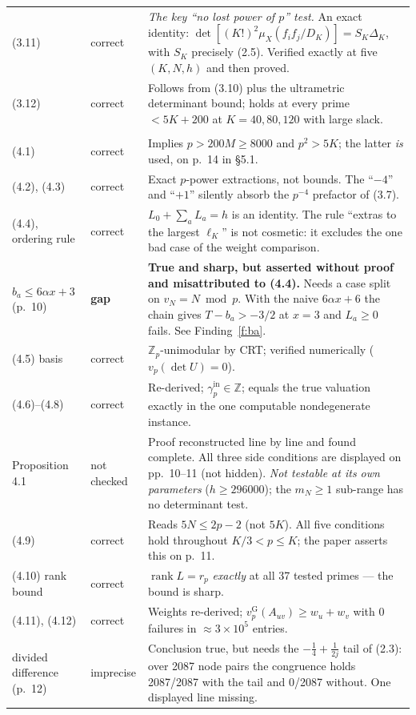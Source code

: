 \documentclass[11pt]{article}
\theoremstyle{definition}
\newcommand{\vG}{v_p^{\mathrm{G}}}
\newcommand{\gin}{\gamma_p^{\mathrm{in}}}
\newcommand{\OK}{correct}
\newcommand{\IM}{imprecise}
\newcommand{\GP}{\textbf{gap}}
\newcommand{\NC}{not checked}
\begin{document}
\begin{longtable}{@{}p{2.55cm}p{1.75cm}p{9.5cm}@{}}
(3.11) & \OK & \emph{The key ``no lost power of $p$'' test.} An exact identity: $\det[(K!)^2\mu_X(f_if_j/D_K)]=S_K\Delta_K$, with $S_K$ precisely (2.5). Verified exactly at five $(K,N,h)$ and then proved. \\
(3.12) & \OK & Follows from (3.10) plus the ultrametric determinant bound; holds at every prime $<5K+200$ at $K=40,80,120$ with large slack. \\
\addlinespace
\multicolumn{3}{@{}l}{\textbf{Section 4}}\\
(4.1) & \OK & Implies $p>200M\ge8000$ and $p^2>5K$; the latter \emph{is} used, on p.~14 in \S5.1. \\
(4.2), (4.3) & \OK & Exact $p$-power extractions, not bounds. The ``$-4$'' and ``$+1$'' silently absorb the $p^{-4}$ prefactor of (3.7). \\
(4.4), ordering rule & \OK & $L_0+\sum_aL_a=h$ is an identity. The rule ``extras to the largest $\ell_K$'' is not cosmetic: it excludes the one bad case of the weight comparison. \\
$b_a\le6\alpha x+3$ (p.~10) & \GP & \textbf{True and sharp, but asserted without proof and misattributed to (4.4).} Needs a case split on $v_N=N\bmod p$. With the naive $6\alpha x+6$ the chain gives $T-b_a>-3/2$ at $x=3$ and $L_a\ge0$ fails. See Finding~\ref{f:ba}. \\
(4.5) basis & \OK & $\mathbb{Z}_p$-unimodular by CRT; verified numerically ($v_p(\det U)=0$). \\
(4.6)--(4.8) & \OK & Re-derived; $\gin\in\mathbb{Z}$; equals the true valuation exactly in the one computable nondegenerate instance. \\
Proposition 4.1 & \NC & Proof reconstructed line by line and found complete. All three side conditions are displayed on pp.~10--11 (not hidden). \emph{Not testable at its own parameters} ($h\ge296000$); the $m_N\ge1$ sub-range has no determinant test. \\
(4.9) & \OK & Reads $5N\le2p-2$ (not $5K$). All five conditions hold throughout $K/3<p\le K$; the paper asserts this on p.~11. \\
(4.10) rank bound & \OK & $\operatorname{rank}L=r_p$ \emph{exactly} at all 37 tested primes --- the bound is sharp. \\
(4.11), (4.12) & \OK & Weights re-derived; $\vG(A_{uv})\ge w_u+w_v$ with 0 failures in $\approx3\times10^5$ entries. \\
divided difference (p.~12) & \IM & Conclusion true, but needs the $-\tfrac14+\tfrac1{2j}$ tail of (2.3): over 2087 node pairs the congruence holds 2087/2087 with the tail and 0/2087 without. One displayed line missing. \\

\end{longtable}
\end{document}
